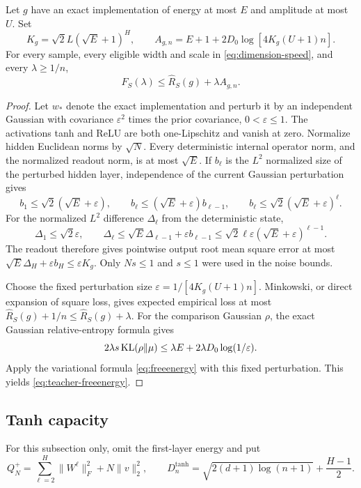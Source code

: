 \begin{lemma}
\label{lem:teacher-neighborhood}
Let $g$ have an exact implementation of energy at most $E$ and amplitude at most $U$. Set
\begin{equation}
 K_g=\sqrt2L(\sqrt E+1)^H,
 \qquad A_{g,n}=E+1+2D_0\log[4K_g(U+1)n].
 \label{eq:teacher-cost}
\end{equation}
For every sample, every eligible width and scale in \eqref{eq:dimension-speed}, and every $\lambda\ge1/n$,
\begin{equation}
 F_S(\lambda)\le\widehat R_S(g)+\lambda A_{g,n}.
 \label{eq:teacher-freeenergy}
\end{equation}
\end{lemma}
\begin{proof}
Let $w_*$ denote the exact implementation and perturb it by an independent Gaussian with covariance $\varepsilon^2$ times the prior covariance, $0<\varepsilon\le1$. The activations tanh and ReLU are both one-Lipschitz and vanish at zero. Normalize hidden Euclidean norms by $\sqrt N$. Every deterministic internal operator norm, and the normalized readout norm, is at most $\sqrt E$. If $b_\ell$ is the $L^2$ normalized size of the perturbed hidden layer, independence of the current Gaussian perturbation gives
\[
 b_1\le\sqrt2(\sqrt E+\varepsilon),\qquad
 b_\ell\le(\sqrt E+\varepsilon)b_{\ell-1},
 \qquad b_\ell\le\sqrt2(\sqrt E+\varepsilon)^\ell.
\]
For the normalized $L^2$ difference $\Delta_\ell$ from the deterministic state,
\[
 \Delta_1\le\sqrt2\varepsilon,\qquad
 \Delta_\ell\le\sqrt E\Delta_{\ell-1}+\varepsilon b_{\ell-1}
 \le\sqrt2\ell\varepsilon(\sqrt E+\varepsilon)^{\ell-1}.
\]
The readout therefore gives pointwise output root mean square error at most
$\sqrt E\Delta_H+\varepsilon b_H\le\varepsilon K_g$.
Only $Ns\le1$ and $s\le1$ were used in the noise bounds.

Choose the fixed perturbation size $\varepsilon=1/[4K_g(U+1)n]$. Minkowski, or direct expansion of square loss, gives expected empirical loss at most $\widehat R_S(g)+1/n\le\widehat R_S(g)+\lambda$. For the comparison Gaussian $\rho$, the exact Gaussian relative-entropy formula gives
\[
 2\lambda s\operatorname{KL}(\rho\Vert\mu)
 \le\lambda E+2\lambda D_0\log(1/\varepsilon).
\]
Apply the variational formula \eqref{eq:freeenergy} with this fixed perturbation. This yields \eqref{eq:teacher-freeenergy}.
\end{proof}

\subsection{Tanh capacity}
For this subsection only, omit the first-layer energy and put
\[
 Q_N^+=\sum_{\ell=2}^H\|W^\ell\|_F^2+N\|v\|_2^2,
 \qquad D_n^{\tanh}=\sqrt{2(d+1)\log(n+1)}+\frac{H-1}{2}.
\]

